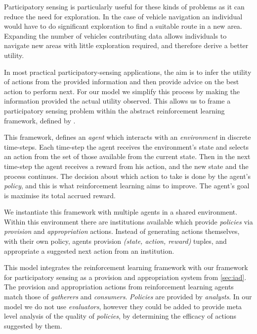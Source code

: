 Participatory sensing is particularly useful for these kinds of problems as it
can reduce the need for exploration. In the case of vehicle navigation an
individual would have to do significant exploration to find a suitable route
in a new area. Expanding the number of vehicles contributing data allows
individuals to navigate new areas with little exploration required, and
therefore derive a better utility.

In most practical participatory-sensing applications, the aim is to infer the
utility of actions from the provided information and then provide advice on
the best action to perform next. For our model we simplify this process by
making the information provided the actual utility observed. This allows us
to frame a participatory sensing problem within the abstract reinforcement
learning framework, defined by \citet{Sutton1998}.

This framework, defines an \emph{agent} which interacts with an
\emph{environment} in discrete time-steps. Each time-step the agent receives
the environment's state and selects an action from the set of those available
from the current state. Then in the next time-step the agent receives a reward
from his action, and the new state and the process continues. The decision
about which action to take is done by the agent's \emph{policy}, and this is
what reinforcement learning aims to improve. The agent's goal is maximise its
total accrued reward.

We instantiate this framework with multiple agents in a shared environment.
Within this environment there are institutions available which provide
\emph{policies} via \emph{provision} and \emph{appropriation} actions. Instead
of generating actions themselves, with their own policy, agents provision
\emph{(state, action, reward)} tuples, and appropriate a suggested next action
from an institution. %

This model integrates the reinforcement learning framework with our framework
for participatory sensing as a provision and appropriation system from
\autoref{sec:iad}. The provision and appropriation actions from reinforcement
learning agents match those of \emph{gatherers} and \emph{consumers}.
\emph{Policies} are provided by \emph{analysts}. In our model we do not use
\emph{evaluators}, however they could be added to provide meta level analysis
of the quality of \emph{policies}, by determining the efficacy of actions
suggested by them.


